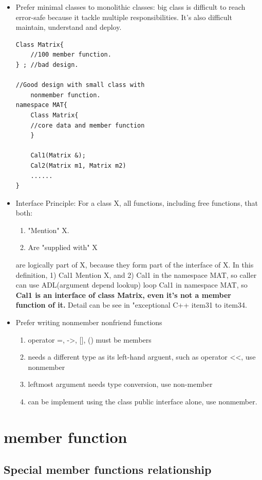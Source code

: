 \documentclass[a4paper,11pt,twoside]{book}
\begin{document}
\begin{itemize}
	\item Prefer minimal classes to monolithic classes: big class is difficult to reach error-safe because it tackle multiple responsibilities. It's also difficult maintain, understand and deploy.
\begin{lstlisting}[numbers=none]
Class Matrix{
	//100 member function.
} ; //bad design.
	
//Good design with small class with
	nonmember function.
namespace MAT{
	Class Matrix{
	//core data and member function
	}
	
	Cal1(Matrix &);
	Cal2(Matrix m1, Matrix m2)
	......
}
\end{lstlisting}

	\item Interface Principle: For a class X, all functions, including free functions, that both:
	\begin{enumerate}
		\item "Mention" X.
		\item Are "supplied with" X
	\end{enumerate}
	are logically part of X, because they form part of the interface of X.  In this definition, 1) Cal1 Mention X,  and 2) Cal1 in the namespace MAT, so caller can use ADL(argument depend lookup) loop Cal1 in namespace MAT, so \textbf{Cal1 is an interface of class Matrix, even it's not a member function of it.} Detail can be see in "exceptional C++ item31 to item34.
	
	\item Prefer writing nonmember nonfriend functions
	\begin{enumerate}
		\item operator =, ->, [], () must be members
		\item needs a different type as its left-hand arguent, such as operator <<, use nonmember
		\item leftmost argument needs type conversion, use non-member
		\item can be implement using the class public interface alone, use nonmember.
	\end{enumerate}
	
\end{itemize}



\section{member function}

\subsection{Special member functions relationship}
\end{document}
